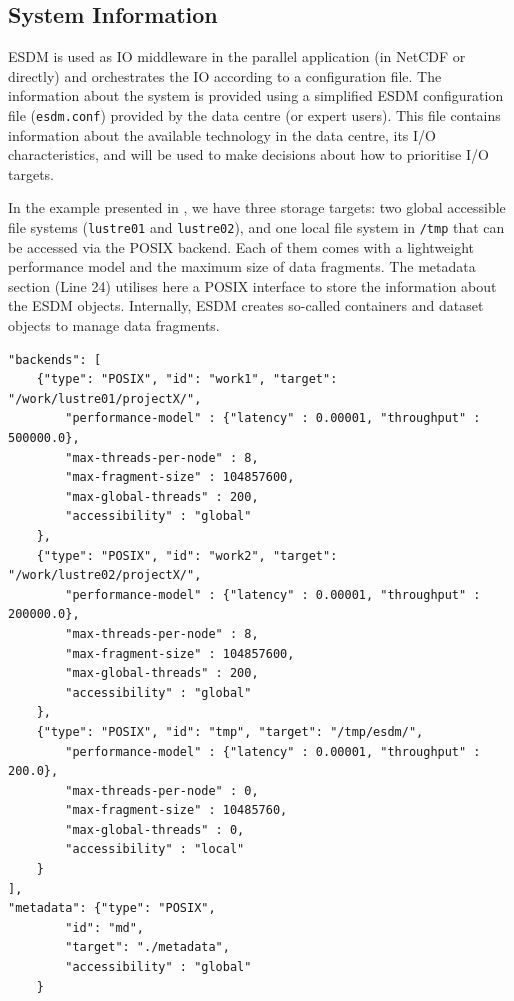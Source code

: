 \documentclass{superfri}
\begin{document}
\subsection{System Information}

ESDM is used as IO middleware in the parallel application (in NetCDF or directly) and orchestrates the IO according to a configuration file.
The information about the system is provided using a simplified ESDM configuration file (\texttt{esdm.conf}) provided by the data centre (or expert users).
This file contains information about the available technology in the data centre, its I/O characteristics, and will be used to make decisions about how to prioritise I/O targets.

In the example presented in , we have three storage targets: two global accessible file systems (\texttt{lustre01} and \texttt{lustre02}), and one local file system in \texttt{/tmp} that can be accessed via the POSIX backend.
Each of them comes with a lightweight performance model and the maximum size of data fragments.
The metadata section (Line 24) utilises here a POSIX interface to store the information about the ESDM objects. Internally, ESDM creates so-called containers and dataset objects to manage data fragments.

\begin{lstlisting}[caption = Example of an ESDM configuration file (\texttt{esdm.conf}), label=lst:esdm.conf]
"backends": [
    {"type": "POSIX", "id": "work1", "target": "/work/lustre01/projectX/",
        "performance-model" : {"latency" : 0.00001, "throughput" : 500000.0},
        "max-threads-per-node" : 8,
        "max-fragment-size" : 104857600,
        "max-global-threads" : 200,
        "accessibility" : "global"
    },
    {"type": "POSIX", "id": "work2", "target": "/work/lustre02/projectX/",
        "performance-model" : {"latency" : 0.00001, "throughput" : 200000.0},
        "max-threads-per-node" : 8,
        "max-fragment-size" : 104857600,
        "max-global-threads" : 200,
        "accessibility" : "global"
    },
    {"type": "POSIX", "id": "tmp", "target": "/tmp/esdm/",
        "performance-model" : {"latency" : 0.00001, "throughput" : 200.0},
        "max-threads-per-node" : 0,
        "max-fragment-size" : 10485760,
        "max-global-threads" : 0,
        "accessibility" : "local"
    }
],
"metadata": {"type": "POSIX",
        "id": "md",
        "target": "./metadata",
        "accessibility" : "global"
    }
\end{lstlisting}
\end{document}
